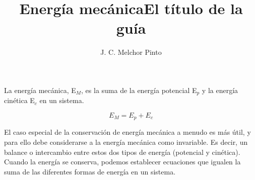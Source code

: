 \documentclass[12pt,addpoints,answers]{guia}
\title{Energía mecánica}
\title{El título de la guía}
\author{J. C. Melchor Pinto}
\begin{document}
\pagestyle{headandfoot}

\INFO
\begin{opening}
    {La energía mecánica, E$_M$, es la suma de la energía potencial E$_p$ y
        la energía cinética E$_c$ en un sistema.

        \[ E_M=E_p+E_c\]

        El caso especial de la conservación de energía mecánica a menudo es más útil, y para ello debe considerarse a la energía mec\'anica como invariable. Es decir, un balance o intercambio entre estos dos tipos de energía (potencial y cinética). Cuando la energía se conserva, podemos establecer ecuaciones que igualen la suma de las diferentes formas de energía en un sistema.
    }
\end{opening}
\begin{questions}
    
    \newpage
    
    \newpage
    
\end{questions}

\end{document}
